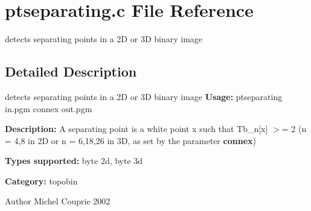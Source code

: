 \section{ptseparating.c File Reference}
\label{ptseparating_8c}


detects separating points in a 2D or 3D binary image  




\subsection{Detailed Description}
detects separating points in a 2D or 3D binary image {\bfseries Usage:} ptseparating in.pgm connex out.pgm

{\bfseries Description:} A separating point is a white point x such that Tb\_\-n[x] $>$= 2 (n = 4,8 in 2D or n = 6,18,26 in 3D, as set by the parameter {\bfseries connex})

{\bfseries Types supported:} byte 2d, byte 3d

{\bfseries Category:} topobin

\begin{DoxyAuthor}{Author}
Michel Couprie 2002 
\end{DoxyAuthor}
